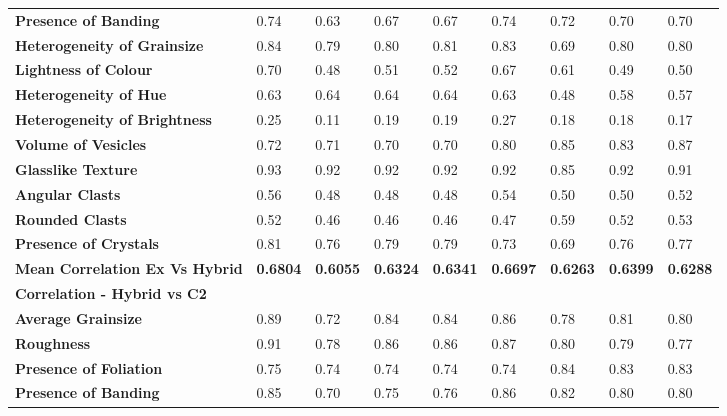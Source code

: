 \begin{longtable}[c]{@{}lllllllll@{}}
\textbf{Presence of Banding} &
  0.74 &
  0.63 &
  0.67 &
  0.67 &
  0.74 &
  0.72 &
  0.70 &
  0.70 \\
\textbf{Heterogeneity of Grainsize} &
  0.84 &
  0.79 &
  0.80 &
  0.81 &
  0.83 &
  0.69 &
  0.80 &
  0.80 \\
\textbf{Lightness of Colour} &
  0.70 &
  0.48 &
  0.51 &
  0.52 &
  0.67 &
  0.61 &
  0.49 &
  0.50 \\
\textbf{Heterogeneity of Hue} &
  0.63 &
  0.64 &
  0.64 &
  0.64 &
  0.63 &
  0.48 &
  0.58 &
  0.57 \\
\textbf{Heterogeneity of Brightness} &
  0.25 &
  \cellcolor[HTML]{FFFF00}0.11 &
  0.19 &
  0.19 &
  0.27 &
  0.18 &
  0.18 &
  0.17 \\
\textbf{Volume of Vesicles} &
  0.72 &
  0.71 &
  0.70 &
  0.70 &
  0.80 &
  0.85 &
  0.83 &
  0.87 \\
\textbf{Glasslike Texture} &
  0.93 &
  0.92 &
  0.92 &
  0.92 &
  0.92 &
  0.85 &
  0.92 &
  0.91 \\
\textbf{Angular Clasts} &
  0.56 &
  0.48 &
  0.48 &
  0.48 &
  0.54 &
  0.50 &
  0.50 &
  0.52 \\
\textbf{Rounded Clasts} &
  0.52 &
  0.46 &
  0.46 &
  0.46 &
  0.47 &
  0.59 &
  0.52 &
  0.53 \\
\textbf{Presence of Crystals} &
  0.81 &
  0.76 &
  0.79 &
  0.79 &
  0.73 &
  0.69 &
  0.76 &
  0.77 \\
\cellcolor[HTML]{FFFF00}\textbf{Mean Correlation Ex Vs Hybrid} &
  \cellcolor[HTML]{FFFF00}\textbf{0.6804} &
  \textbf{0.6055} &
  \textbf{0.6324} &
  \textbf{0.6341} &
  \textbf{0.6697} &
  \textbf{0.6263} &
  \textbf{0.6399} &
  \textbf{0.6288} \\
\rowcolor[HTML]{E7E6E6} 
\textbf{Correlation - Hybrid vs C2} &
  \textbf{} &
  \textbf{} &
  \textbf{} &
  \textbf{} &
  \textbf{} &
  \textbf{} &
  \textbf{} &
  {\color[HTML]{202124} \textbf{}} \\
\textbf{Average   Grainsize} &
  0.89 &
  0.72 &
  0.84 &
  0.84 &
  0.86 &
  0.78 &
  0.81 &
  {\color[HTML]{202124} 0.80} \\
\textbf{Roughness} &
  0.91 &
  0.78 &
  0.86 &
  0.86 &
  0.87 &
  0.80 &
  0.79 &
  {\color[HTML]{202124} 0.77} \\
\textbf{Presence of Foliation} &
  0.75 &
  0.74 &
  0.74 &
  0.74 &
  0.74 &
  0.84 &
  0.83 &
  {\color[HTML]{202124} 0.83} \\
\textbf{Presence of Banding} &
  0.85 &
  0.70 &
  0.75 &
  0.76 &
  0.86 &
  0.82 &
  0.80 &
  0.80 \\

\end{longtable}
